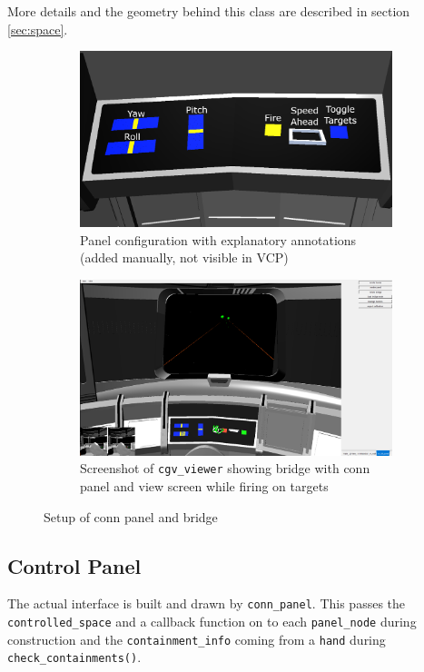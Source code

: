 \documentclass[hyperref, bachelorofscience]{cgvpub}
\begin{document}
More details and the geometry behind this class are described in section \ref{sec:space}.

\begin{figure}
	\begin{subfigure}{.49\linewidth}
		\includegraphics[width=\linewidth]{../pics/panel}
		\caption{Panel configuration with explanatory annotations (added manually, not visible in \gls{VCP})}
		\label{fig:panel}
	\end{subfigure}
	\hfill
	\begin{subfigure}{.49\linewidth}
		\includegraphics[width=\linewidth]{../pics/firing}
		\caption{Screenshot of \lstinline|cgv_viewer| showing bridge with conn panel and view screen while firing on targets}
		\label{fig:firing}
	\end{subfigure}
	\caption{Setup of conn panel and bridge}
\end{figure}

\subsection{Control Panel}
The actual interface is built and drawn by \lstinline|conn_panel|. This passes the \lstinline|controlled_space| and a callback function on to each \lstinline|panel_node| during construction and the \lstinline|containment_info| coming from a \lstinline|hand| during \lstinline|check_containments()|. 
\end{document}
